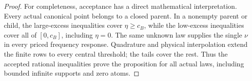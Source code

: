 \begin{proof}
For completeness, acceptance has a direct mathematical interpretation.
Every actual canonical point belongs to a closed parent.
In a nonempty parent or child, the large-excess inequalities cover
$\eta\ge c_B$, while the low-excess inequalities cover all of
$[0,c_B]$, including $\eta=0$. The same unknown law supplies the
single $\nu$ in every priced frequency response. Quadrature and
physical interpolation extend the finite rows to every central
threshold; the tails cover the rest. Thus the accepted rational
inequalities prove the proposition for all actual laws, including
bounded infinite supports and zero atoms.
\end{proof}

